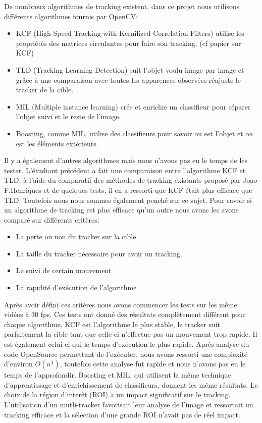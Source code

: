 De nombreux algorithmes de tracking existent, dans ce projet nous utilisons différents algorithmes fournis par OpenCV:
\begin{itemize}
\item KCF (High-Speed Tracking with Kernilized Correlation Filters) utilise les propriétés des matrices circulantes pour faire son tracking. (cf papier sur KCF)
\item TLD (Tracking Learning Detection) suit l'objet voulu image par image et grâce à une comparaison avec toutes les apparences observées réajuste le tracker de la cible. 
\item MIL (Multiple instance learning) crée et enrichie un classifieur pour séparer l'objet suivi et le reste de l'image.
\item Boosting, comme MIL, utilise des classifieurs pour savoir ou est l'objet et ou est les éléments extérieurs. 
\end{itemize}
Il y a également d'autres algorithmes mais nous n'avons pas eu le temps de les tester.
L'étudiant précédent a fait une comparaison entre l'algorithme KCF et TLD, à l'aide  du comparatif des méthodes de tracking existants proposé par Joao F.Henriques et de quelques tests, il en a ressorti que KCF  était plus efficace que TLD. 
Toutefois nous nous sommes également penché sur ce sujet. Pour savoir si un algorithme de tracking est plus efficace qu'un autre nous avons les avons comparé sur différents critères: 
\begin{itemize}
\item La perte ou non du tracker sur la cible.
\item La taille du tracker nécessaire pour avoir un tracking.
\item Le suivi de certain mouvement
\item La rapidité d'exécution de l'algorithme
\end{itemize}
Après avoir défini ces critères nous avons commencer les tests sur les même vidéos à 30 fps. Ces tests ont donné des résultats complètement différent pour chaque algorithme.
KCF est l'algorithme le plus stable, le tracker suit parfaitement la cible tant que celle-ci n'effectue pas un mouvement trop rapide. Il est également celui-ci qui le temps d'exécution le plus rapide. Après analyse du code OpenSource  permettant de l'exécuter, nous avons ressorti une complexité d'environ $O(n^{4})$, toutefois cette analyse fut rapide et nous n'avons pas eu le temps de l'approfondir.
Boosting et MIL, qui utilisent la même technique d'apprentissage et d'enrichissement de classifieurs, donnent les même résultats. Le choix de la région d'interêt (ROI) a un impact significatif sur le tracking. L'utilisation d'un mutli-tracker favorisait leur analyse de l'image et ressortait un tracking efficace et la sélection d'une grande  ROI n'avait pas de réel impact.
